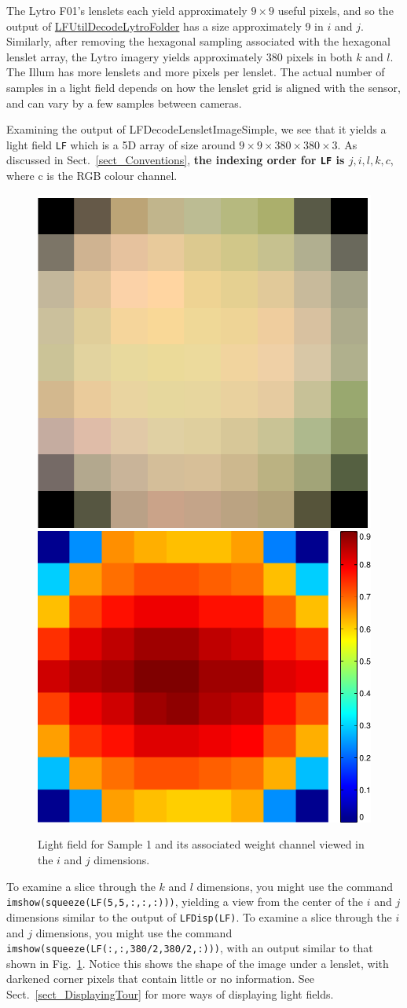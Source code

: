 \documentclass[onecolumn]{article}
\newcommand{\CiteFunc}[1]{\hyperlink{#1}{\small #1}}
\newcommand{\SupFunction}[1]{{\small #1}}
\newcommand{\SymbolText}[1]{\texttt{\small #1}}
\begin{document}
The Lytro F01's lenslets each yield approximately $9 \times 9$ useful pixels, and so the output of \CiteFunc{LFUtilDecodeLytroFolder} has a size approximately 9 in $i$ and $j$. Similarly, after removing the hexagonal sampling associated with the hexagonal lenslet array, the Lytro imagery yields approximately $380$ pixels in both $k$ and $l$.  The Illum has more lenslets and more pixels per lenslet. The actual number of samples in a light field depends on how the lenslet grid is aligned with the sensor, and can vary by a few samples between cameras.

Examining the output of \SupFunction{LFDecodeLensletImageSimple}, we see that it yields a light field \SymbolText{LF} which is a 5D array of size around $9\times9\times380\times380\times3$. As discussed in Sect.~\ref{sect_Conventions}, \textbf{the indexing order for \SymbolText{LF} is $j, i, l, k, c$}, where c is the RGB colour channel. 

\begin{figure}[tbh]
	\centering
	\includegraphics[height=0.45\textwidth]{Figs/STSlice}
	\includegraphics[height=0.45\textwidth]{Figs/WeightSTSlice}
	\caption{Light field for Sample 1 and its associated weight channel viewed in the $i$ and $j$ dimensions.}
	\label{fig_STSlice}
\end{figure}

To examine a slice through the $k$ and $l$ dimensions, you might use the command \SymbolText{imshow(squeeze(LF(5,5,:,:,:)))}, yielding a view from the center of the $i$ and $j$ dimensions similar to the output of \SymbolText{LFDisp(LF)}. To examine a slice through the $i$ and $j$ dimensions, you might use the command \SymbolText{imshow(squeeze(LF(:,:,380/2,380/2,:)))}, with an output similar to that shown in Fig.~\ref{fig_STSlice}. Notice this shows the shape of the image under a lenslet, with darkened corner pixels that contain little or no information. See Sect.~\ref{sect_DisplayingTour} for more ways of displaying light fields.
\end{document}

